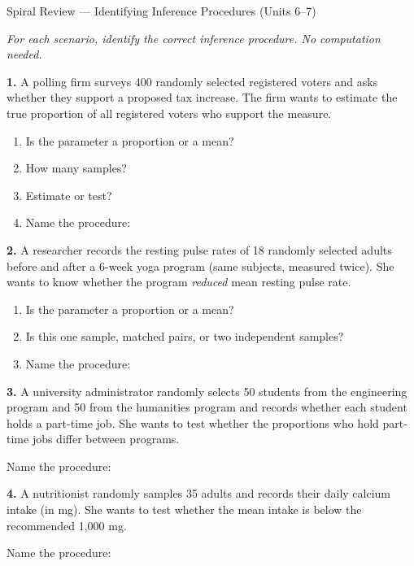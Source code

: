 \documentclass[10pt]{article}
\begin{document}
\namedateperiod

\vspace{0.12in}

\begin{notesbox}{Spiral Review --- Identifying Inference Procedures (Units 6--7)}

\textit{For each scenario, identify the correct inference procedure. No computation needed.}

\vspace{0.06in}
\textbf{1.} A polling firm surveys 400 randomly selected registered voters and asks whether
they support a proposed tax increase. The firm wants to estimate the true proportion of all
registered voters who support the measure.

\begin{enumerate}[label=\alph*.]
  \item Is the parameter a proportion or a mean? 
  \item How many samples? 
  \item Estimate or test? 
  \item Name the procedure: 
\end{enumerate}

\vspace{0.10in}
\textbf{2.} A researcher records the resting pulse rates of 18 randomly selected adults before
and after a 6-week yoga program (same subjects, measured twice). She wants to know whether the
program \emph{reduced} mean resting pulse rate.

\begin{enumerate}[label=\alph*.]
  \item Is the parameter a proportion or a mean? 
  \item Is this one sample, matched pairs, or two independent samples? 
  \item Name the procedure: 
\end{enumerate}

\vspace{0.10in}
\textbf{3.} A university administrator randomly selects 50 students from the engineering program
and 50 from the humanities program and records whether each student holds a part-time job. She
wants to test whether the proportions who hold part-time jobs differ between programs.

Name the procedure: 

\vspace{0.10in}
\textbf{4.} A nutritionist randomly samples 35 adults and records their daily calcium intake
(in mg). She wants to test whether the mean intake is below the recommended 1,000 mg.

Name the procedure: 

\end{notesbox}
\end{document}
